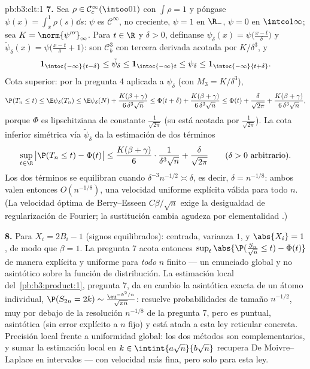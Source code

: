 \begin{solution}{pb:b3:clt:1}
\textbf{7.} Sea $\rho \in \mathcal C^\infty_c(\intoo01)$ con
$\int\rho = 1$ y póngase $\psi(x) = \int_x^1\rho(s)\dd
s$: $\psi$ es $\mathcal C^\infty$, no creciente, $\psi = 1$ en $\R_-$,
$\psi = 0$ en $\intco1\infty$; sea $K =
\norm{\psi'''}_\infty$. Para $t \in \R$ y $\delta > 0$, defínanse
$\psi_\delta(x) = \psi\bigl(\frac{x - t}\delta\bigr)$ y
$\tilde\psi_\delta(x) = \psi\bigl(\frac{x - t}\delta +
1\bigr)$: son $\mathcal C^3_b$ con tercera derivada acotada por
$K/\delta^3$, y
\[
\mathbf 1_{\intoc{-\infty}{t-\delta}} \leq
\tilde\psi_\delta \leq \mathbf 1_{\intoc{-\infty}t} \leq
\psi_\delta \leq \mathbf 1_{\intoc{-\infty}{t+\delta}} .
\]
Cota superior: por la pregunta 4 aplicada a $\psi_\delta$ (con
$M_3 = K/\delta^3$),
\[
\P(T_n \leq t) \leq \E\psi_\delta(T_n) \leq
\E\psi_\delta(N) + \frac{K(\beta +
\gamma)}{6\,\delta^3\sqrt n}
\leq \Phi(t + \delta) + \frac{K(\beta +
\gamma)}{6\,\delta^3\sqrt n}
\leq \Phi(t) + \frac{\delta}{\sqrt{2\pi}} +
\frac{K(\beta + \gamma)}{6\,\delta^3\sqrt n},
\]
porque $\Phi$ es lipschitziana de constante $\frac1{\sqrt{2\pi}}$ (su
 está acotada por
$\frac1{\sqrt{2\pi}}$). La cota inferior simétrica vía
$\tilde\psi_\delta$ da la estimación de dos términos
\[
\sup_{t\in\R}\,\bigl|\P(T_n \leq t) - \Phi(t)\bigr| \leq
\frac{K(\beta + \gamma)}{6}\cdot\frac{1}{\delta^3\sqrt n} +
\frac{\delta}{\sqrt{2\pi}}
\qquad(\delta > 0\ \text{arbitrario}).
\]
Los dos términos se equilibran cuando $\delta^{-3}n^{-1/2} \asymp
\delta$, es decir, $\delta = n^{-1/8}$: ambos valen entonces
$O(n^{-1/8})$, una velocidad uniforme explícita válida para todo $n$.
(La velocidad óptima de Berry--Esseen $C\beta/\sqrt n$ exige la
desigualdad de regularización de Fourier; la sustitución cambia agudeza
por elementalidad .)

\textbf{8.} Para $X_i = 2B_i - 1$ (signos equilibrados): centrada,
varianza $1$, y $\abs{X_i} = 1$, de modo que $\beta = 1$. La pregunta 7
acota entonces $\sup_t\abs{\P(\frac{S_n}{\sqrt n} \leq t) -
\Phi(t)}$ de manera explícita y uniforme para \emph{todo} $n$ finito ---
un enunciado global y no asintótico sobre la función de distribución. La
estimación local del~\cref{pb:b3:product:1}, pregunta 7, da en cambio la
asintótica exacta de un átomo individual, $\P(S_{2n} = 2k) \sim
\frac{\eu^{-k^2/n}}{\sqrt{\pi n}}$: resuelve probabilidades de tamaño
$n^{-1/2}$, muy por debajo de la resolución $n^{-1/8}$ de la pregunta 7,
pero es puntual, asintótica (sin error explícito a $n$ fijo) y está
atada a esta ley reticular concreta. Precisión local frente a
uniformidad global: los dos métodos son complementarios, y sumar la
estimación local en $k \in \intint{a\sqrt n}{b\sqrt n}$ recupera De
Moivre--Laplace en intervalos --- con velocidad más fina, pero solo para
esta ley.


\end{solution}

